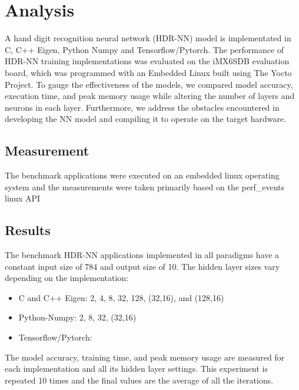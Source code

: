 \part{Analysis}
A hand digit recognition neural network (HDR-NN) model is implementated in C, C++ Eigen, Python Numpy and Tensorflow/Pytorch. The performance of HDR-NN training implementations was evaluated on the iMX6SDB evaluation board, which was programmed with an Embedded Linux built using The Yocto Project. To gauge the effectiveness of the models, we compared model accuracy, execution time, and peak memory usage while altering the number of layers and neurons in each layer. Furthermore, we address the obstacles encountered in developing the NN model and compiling it to operate on the target hardware.


\chapter{Measurement}

The benchmark applications were executed on an embedded linux operating system and the measurements were taken primarily based on the perf\_events linux API

\chapter{Results}
The benchmark HDR-NN applications implemented in all paradigms have a constant input size of 784 and output size of 10. The hidden layer sizes vary depending on the implementation:
\begin{itemize}
	\item C and C++ Eigen: 2, 4, 8, 32, 128, (32,16), and (128,16)
	\item Python-Numpy: 2, 8, 32, (32,16)
	\item Tensorflow/Pytorch:
\end{itemize}

The model accuracy, training time, and peak memory usage are measured for each implementation and all its hidden layer settings. This experiment is repeated 10 times and the final values are the average of all the iterations.

